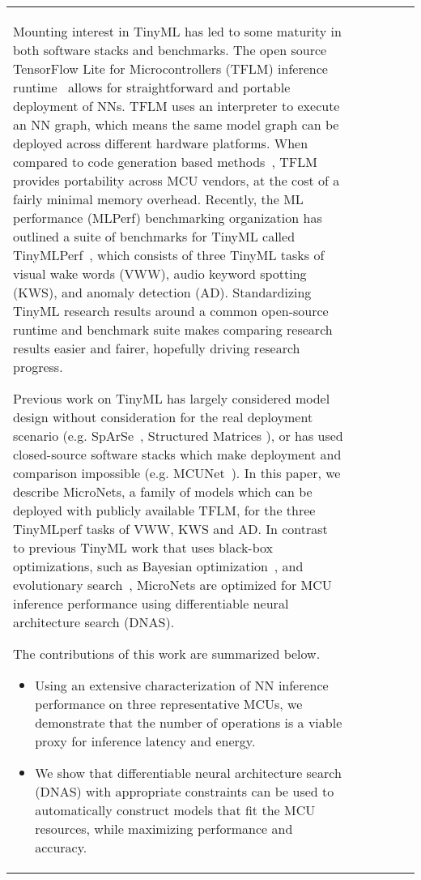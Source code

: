 \documentclass{article}
\begin{document}
\begin{table}[t]
\begin{tabular}{l| c | c | c | c | c}
Mounting interest in TinyML has led to some maturity in both software stacks and benchmarks.
The open source TensorFlow Lite for Microcontrollers (TFLM) inference runtime~\cite{david2020tensorflow} allows for straightforward and portable deployment of NNs.
TFLM uses an interpreter to execute an NN graph, which means the same model graph can be deployed across different hardware platforms.
When compared to code generation based methods~\cite{utensor}, TFLM provides portability across MCU vendors, at the cost of a fairly minimal memory overhead.
Recently, the ML performance (MLPerf) benchmarking organization has outlined a suite of benchmarks for TinyML called TinyMLPerf~\cite{banbury2020benchmarking}, which consists of three TinyML tasks of visual wake words (VWW), audio keyword spotting (KWS), and anomaly detection (AD).
Standardizing TinyML research results around a common open-source runtime and benchmark suite makes comparing research results easier and fairer, hopefully driving research progress.







Previous work on TinyML has largely considered model design without consideration for the real deployment scenario (e.g. SpArSe~\cite{fedorov2019sparse}, Structured Matrices \cite{urmish1,9027218}), or has used closed-source software stacks which make deployment and comparison impossible (e.g. MCUNet~\cite{lin2020mcunet}).
In this paper, we describe MicroNets, a family of models which can be deployed with publicly available TFLM, for the three TinyMLperf tasks of VWW, KWS and AD.
In contrast to previous TinyML work that uses black-box optimizations, such as Bayesian optimization~\cite{fedorov2019sparse}, and evolutionary search~\cite{lin2020mcunet}, MicroNets are optimized for MCU inference performance using differentiable neural architecture search (DNAS).


The contributions of this work are summarized below.
\begin{itemize}


    \item Using an extensive characterization of NN inference performance on three representative MCUs, we demonstrate that the number of operations is a viable proxy for inference latency and energy.


    \item We show that differentiable neural architecture search (DNAS) with appropriate constraints can be used to automatically construct models that fit the MCU resources, while maximizing performance and accuracy. 



\end{itemize}
\end{tabular}
\end{table}
\end{document}
